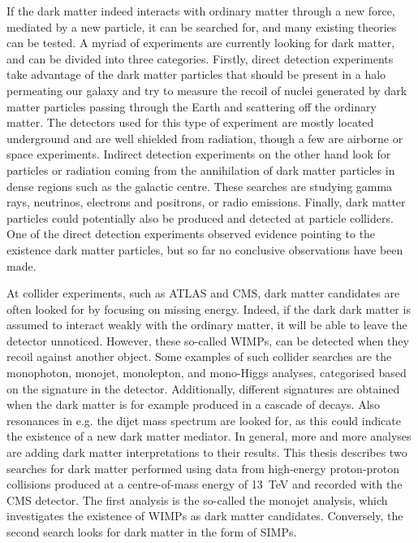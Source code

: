 If the dark matter indeed interacts with ordinary matter through a new force, mediated by a new particle, it can be searched for, and many existing theories can be tested. A myriad of experiments are currently looking for dark matter, and can be divided into three categories. Firstly, direct detection experiments take advantage of the dark matter particles that should be present in a halo permeating our galaxy and try to measure the recoil of nuclei generated by dark matter particles passing through the Earth and scattering off the ordinary matter. The detectors used for this type of experiment are mostly located underground and are well shielded from radiation, though a few are airborne or space experiments. Indirect detection experiments on the other hand look for particles or radiation coming from the annihilation of dark matter particles in dense regions such as the galactic centre. These searches are studying gamma rays, neutrinos, electrons and positrons, or radio emissions. Finally, dark matter particles could potentially also be produced and detected at particle colliders. One of the direct detection experiments observed evidence pointing to the existence dark matter particles, but so far no conclusive observations have been made.

At collider experiments, such as \acs{ATLAS} and \acs{CMS}, dark matter candidates are often looked for by focusing on missing energy. Indeed, if the dark dark matter is assumed to interact weakly with the ordinary matter, it will be able to leave the detector unnoticed. However, these so-called \acfp{WIMP}, can be detected when they recoil against another object. Some examples of such collider searches are the monophoton, monojet, monolepton, and mono-Higgs analyses, categorised based on the signature in the detector. Additionally, different signatures are obtained when the dark matter is for example produced in a cascade of decays. Also resonances in e.g. the dijet mass spectrum are looked for, as this could indicate the existence of a new dark matter mediator. In general, more and more analyses are adding dark matter interpretations to their results. This thesis describes two searches for dark matter performed using data from high-energy proton-proton collisions produced at a centre-of-mass energy of \SI{13}{TeV} and recorded with the \acs{CMS} detector. The first analysis is the so-called the monojet analysis, which investigates the existence of \acsp{WIMP} as dark matter candidates. Conversely, the second search looks for dark matter in the form of \acfp{SIMP}.

